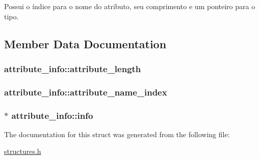 Possui o índice para o nome do atributo, seu comprimento e um ponteiro para o tipo. 

\subsection{Member Data Documentation}
\subsubsection[{\texorpdfstring{attribute\+\_\+length}{attribute_length}}]{ attribute\+\_\+info\+::attribute\+\_\+length}\hypertarget{structattribute__info_a1ed8f679458c4bb0ed3315721588f50d}{}\label{structattribute__info_a1ed8f679458c4bb0ed3315721588f50d}
\subsubsection[{\texorpdfstring{attribute\+\_\+name\+\_\+index}{attribute_name_index}}]{ attribute\+\_\+info\+::attribute\+\_\+name\+\_\+index}\hypertarget{structattribute__info_a19df9d4b42eb55ca5dc1bed98df89378}{}\label{structattribute__info_a19df9d4b42eb55ca5dc1bed98df89378}
\subsubsection[{\texorpdfstring{info}{info}}]{$\ast$ attribute\+\_\+info\+::info}\hypertarget{structattribute__info_a78e740adccb41defb505248c47093958}{}\label{structattribute__info_a78e740adccb41defb505248c47093958}


The documentation for this struct was generated from the following file\+:\begin{DoxyCompactItemize}
\item 
\hyperlink{structures_8h}{structures.\+h}\end{DoxyCompactItemize}
